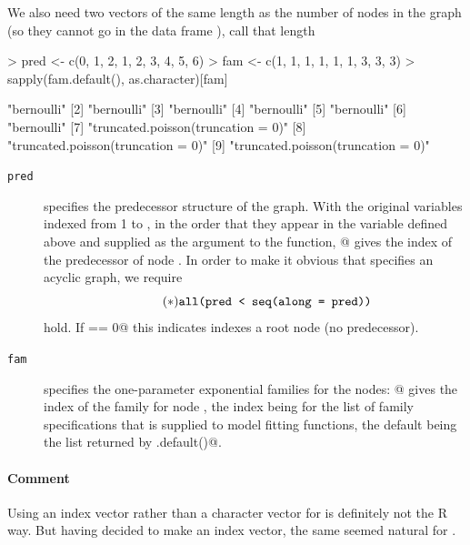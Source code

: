 \documentclass[11pt]{article}
\begin{document}
We also need two vectors of the same length as the number of nodes in the
graph (so they cannot go in the data frame \verb@redata@),
call that length \verb@nnode@
\begin{Schunk}
\begin{Sinput}
> pred <- c(0, 1, 2, 1, 2, 3, 4, 5, 6)
> fam <- c(1, 1, 1, 1, 1, 1, 3, 3, 3)
> sapply(fam.default(), as.character)[fam]
\end{Sinput}
\begin{Soutput}
[1] "bernoulli"                        
[2] "bernoulli"                        
[3] "bernoulli"                        
[4] "bernoulli"                        
[5] "bernoulli"                        
[6] "bernoulli"                        
[7] "truncated.poisson(truncation = 0)"
[8] "truncated.poisson(truncation = 0)"
[9] "truncated.poisson(truncation = 0)"
\end{Soutput}
\end{Schunk}
\begin{description}
\item[\normalfont \texttt{pred}] specifies the predecessor structure of
the graph.  With the original variables indexed from 1 to \verb@nnode@,
in the order that they appear in the variable \verb@vars@ defined above
and supplied as the \verb@varying@ argument to the \verb@reshape@ function,
\verb@pred[j]@ gives the index of the predecessor of node \verb@j@.
In order to make it obvious that \verb@pred@ specifies an acyclic graph,
we require
\begin{equation} \label{eq:foo} \tag{$*$}
\verb@all(pred < seq(along = pred))@
\end{equation}
hold.  If \verb@pred[j] == 0@ this indicates \verb@j@ indexes a root node
(no predecessor).
\item[\normalfont \texttt{fam}] specifies the one-parameter exponential
families for the nodes: \verb@fam[j]@ gives the index of the family for
node \verb@j@, the index being for the list of family specifications
that is supplied to model fitting functions, the default being the list
returned by \verb@fam.default()@.
\end{description}

\paragraph{Comment}  Using an index vector rather than a character vector
for \verb@fam@ is definitely not the R way.  But having decided
to make \verb@pred@ an index vector, the same seemed natural for \verb@fam@.
\end{document}
